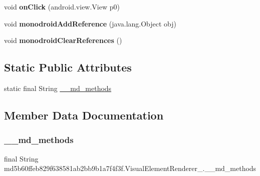 \begin{DoxyCompactItemize}
\item 
\mbox{\label{classmd5b60ffeb829f638581ab2bb9b1a7f4f3f_1_1_visual_element_renderer__1_a165217664d81a84fa2cbef99a09676ba}} 
void {\bfseries on\+Click} (android.\+view.\+View p0)
\item 
\mbox{\label{classmd5b60ffeb829f638581ab2bb9b1a7f4f3f_1_1_visual_element_renderer__1_a321b2967faff34b0f7971f55915f583e}} 
void {\bfseries monodroid\+Add\+Reference} (java.\+lang.\+Object obj)
\item 
\mbox{\label{classmd5b60ffeb829f638581ab2bb9b1a7f4f3f_1_1_visual_element_renderer__1_a4a1c180026d8eab71549e47b7de4b9b8}} 
void {\bfseries monodroid\+Clear\+References} ()
\end{DoxyCompactItemize}
\subsection*{Static Public Attributes}
\begin{DoxyCompactItemize}
\item 
static final String \hyperlink{classmd5b60ffeb829f638581ab2bb9b1a7f4f3f_1_1_visual_element_renderer__1_a4ef182bc984a4330ed789e1f0b0222d1}{\+\_\+\+\_\+md\+\_\+methods}
\end{DoxyCompactItemize}


\subsection{Member Data Documentation}
\mbox{\label{classmd5b60ffeb829f638581ab2bb9b1a7f4f3f_1_1_visual_element_renderer__1_a4ef182bc984a4330ed789e1f0b0222d1}} 
\subsubsection{\texorpdfstring{\+\_\+\+\_\+md\+\_\+methods}{\_\_md\_methods}}
{\footnotesize\ttfamily final String md5b60ffeb829f638581ab2bb9b1a7f4f3f.\+Visual\+Element\+Renderer\+\_.\+\_\+\+\_\+md\+\_\+methods\hspace{0.3cm}{\ttfamily [static]}}



